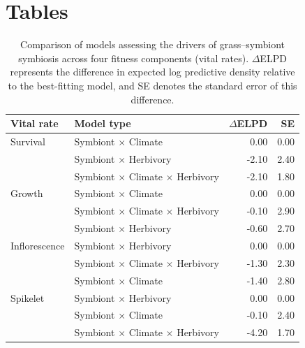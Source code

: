 \documentclass[12pt]{article}\usepackage[]{graphicx}\usepackage[dvipsnames]{xcolor}
\begin{document}
\section*{Tables}
{
\captionsetup[table]{list=no}

\begin{table}[h]
\centering
\caption{Comparison of models assessing the drivers of grass--symbiont symbiosis across four fitness components (vital rates). 
$\Delta$ELPD represents the difference in expected log predictive density relative to the best-fitting model, and SE denotes the standard error of this difference.}
\label{tab:comp_table_driver}
\begin{tabular}{llrr}
\toprule
\textbf{Vital rate} & \textbf{Model type} & \textbf{$\Delta$ELPD} & \textbf{SE} \\
\midrule
Survival      
 & Symbiont $\times$ Climate                    & 0.00  & 0.00 \\
 & Symbiont $\times$ Herbivory                  & -2.10 & 2.40 \\
 & Symbiont $\times$ Climate $\times$ Herbivory & -2.10 & 1.80 \\
Growth        
 & Symbiont $\times$ Climate                    & 0.00  & 0.00 \\
 & Symbiont $\times$ Climate $\times$ Herbivory & -0.10 & 2.90 \\
 & Symbiont $\times$ Herbivory                  & -0.60 & 2.70 \\
Inflorescence 
 & Symbiont $\times$ Herbivory                  & 0.00  & 0.00 \\
 & Symbiont $\times$ Climate $\times$ Herbivory & -1.30 & 2.30 \\
 & Symbiont $\times$ Climate                    & -1.40 & 2.80 \\
Spikelet      
 & Symbiont $\times$ Herbivory                  & 0.00  & 0.00 \\
 & Symbiont $\times$ Climate                    & -0.10 & 2.40 \\
 & Symbiont $\times$ Climate $\times$ Herbivory & -4.20 & 1.70 \\
\bottomrule
\end{tabular}
\end{table}

\clearpage
\appendix

\setcounter{figure}{0}
\setcounter{table}{0}
\setcounter{equation}{0}
\setcounter{section}{0}

\renewcommand{\thesection}{S.\arabic{section}}

}
\end{document}
